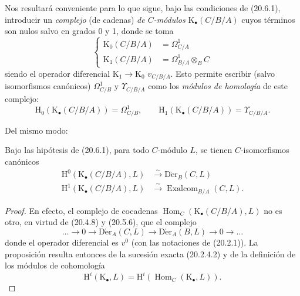 \begin{env}[20.6.5]
\label{0.20.6.5-fr}
Nos resultará conveniente para lo que sigue, bajo las condiciones de (20.6.1),
introducir un \emph{complejo} (de cadenas) \emph{de $C$-módulos}
$\mathrm{K}_\bullet(C/B/A)$ cuyos términos son nulos salvo en grados 0
y 1, donde se toma
\begin{equation}
\tag{20.6.5.1}
\label{0.20.6.5.1-fr}
\left\{
\begin{aligned}
  \mathrm{K}_0(C/B/A)&=\Omega^1_{C/A}\\
  \mathrm{K}_1(C/B/A)&=\Omega^1_{B/A}\otimes_B C
\end{aligned}
\right.
\end{equation}
siendo el operador diferencial $\mathrm{K}_1\to\mathrm{K}_0$
$v_{C/B/A}$. Esto permite escribir (salvo isomorfismos canónicos)
$\Omega^1_{C/B}$ y $\Upsilon_{C/B/A}$ como los \emph{módulos
de homología} de este complejo:
\begin{equation}
\tag{20.6.5.2}
\label{0.20.6.5.2-fr}
  \mathrm{H}_0(\mathrm{K}_\bullet(C/B/A))=\Omega^1_{C/B},\qquad
  \mathrm{H}_1(\mathrm{K}_\bullet(C/B/A))=\Upsilon_{C/B/A}.
\end{equation}
\end{env}

Del mismo modo:
\begin{proposition}[20.6.6]
\label{0.20.6.6-fr}
Bajo las hipótesis de \textup{(20.6.1)}, para todo $C$-módulo $L$, se tienen
$C$-isomorfismos canónicos
\begin{align}
\tag{20.6.6.1}
\label{0.20.6.6.1-fr}
  \mathrm{H}^0(\mathrm{K}_\bullet(C/B/A),L)&\xrightarrow{\sim}\operatorname{D\acute{e}r}_B(C,L)\\
\tag{20.6.6.2}
\label{0.20.6.6.2-fr}
  \mathrm{H}^1(\mathrm{K}_\bullet(C/B/A),L)&\xrightarrow{\sim}
  \operatorname{Exalcom}_{B/A}(C,L).
\end{align}
\end{proposition}

\begin{proof}
En efecto, el complejo de cocadenas
$\operatorname{Hom}_C(\mathrm{K}_\bullet(C/B/A),L)$ no es otro, en virtud de
(20.4.8)
y (20.5.6), que el complejo
\[
  \ldots\longrightarrow0\longrightarrow\operatorname{D\acute{e}r}_A(C,L)
  \longrightarrow\operatorname{D\acute{e}r}_A(B,L)\longrightarrow0\longrightarrow\ldots
\]
donde el operador diferencial es $v^0$ (con las notaciones de (20.2.1)).
La proposición resulta entonces de la sucesión exacta (20.2.4.2) y de la
definición de los módulos de cohomología
\begin{equation}
\tag{20.6.6.3}
\label{0.20.6.6.3-fr}
  \mathrm{H}^i(\mathrm{K}_\bullet,L)=
  \mathrm{H}^i(\operatorname{Hom}_C(\mathrm{K}_\bullet,L)).
\end{equation}
\end{proof}

